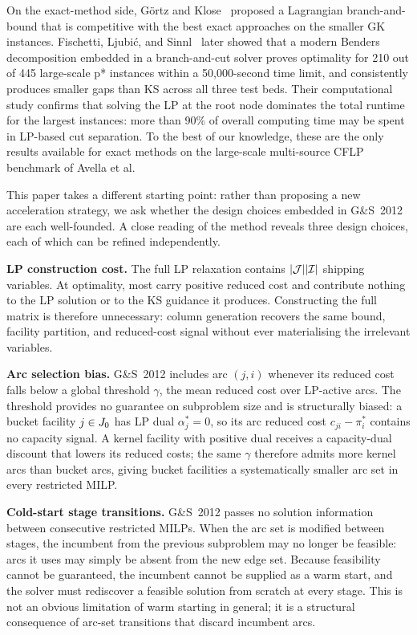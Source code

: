 On the exact-method side, Görtz and Klose~\citep{gortz2012lagrangian} proposed a
Lagrangian branch-and-bound that is competitive with the best exact approaches on
the smaller GK instances.
Fischetti, Ljubić, and Sinnl~\citep{fischetti2016benders} later showed that a
modern Benders decomposition embedded in a branch-and-cut solver proves optimality
for 210 out of 445 large-scale p* instances within a 50{,}000-second time limit,
and consistently produces smaller gaps than KS across all three test beds.
Their computational study confirms that solving the LP at the root node
dominates the total runtime for the largest instances: more than 90\% of overall
computing time may be spent in LP-based cut separation.
To the best of our knowledge, these are the only results available for exact
methods on the large-scale multi-source CFLP benchmark of Avella et al.

This paper takes a different starting point: rather than proposing a new
acceleration strategy, we ask whether the design choices embedded in G\&S~2012
are each well-founded.
A close reading of the method reveals three design choices, each of which can
be refined independently.

\textbf{LP construction cost.}
The full LP relaxation contains $|\mathcal{J}||\mathcal{I}|$ shipping variables.
At optimality, most carry positive reduced cost and contribute nothing to the
LP solution or to the KS guidance it produces.
Constructing the full matrix is therefore unnecessary: column generation recovers
the same bound, facility partition, and reduced-cost signal without ever
materialising the irrelevant variables.

\textbf{Arc selection bias.}
G\&S~2012 includes arc $(j,i)$ whenever its reduced cost falls below a global
threshold $\gamma$, the mean reduced cost over LP-active arcs.
The threshold provides no guarantee on subproblem size and is structurally
biased: a bucket facility $j \in J_0$ has LP dual $\alpha^*_j = 0$, so its
arc reduced cost $c_{ji} - \pi^*_i$ contains no capacity signal.
A kernel facility with positive dual receives a capacity-dual discount that
lowers its reduced costs; the same $\gamma$ therefore admits more kernel arcs
than bucket arcs, giving bucket facilities a systematically smaller arc set
in every restricted MILP.

\textbf{Cold-start stage transitions.}
G\&S~2012 passes no solution information between consecutive restricted MILPs.
When the arc set is modified between stages, the incumbent from the previous
subproblem may no longer be feasible: arcs it uses may simply be absent from the
new edge set.
Because feasibility cannot be guaranteed, the incumbent cannot be supplied as
a warm start, and the solver must rediscover a feasible solution from scratch at
every stage.
This is not an obvious limitation of warm starting in general; it is a
structural consequence of arc-set transitions that discard incumbent arcs.

